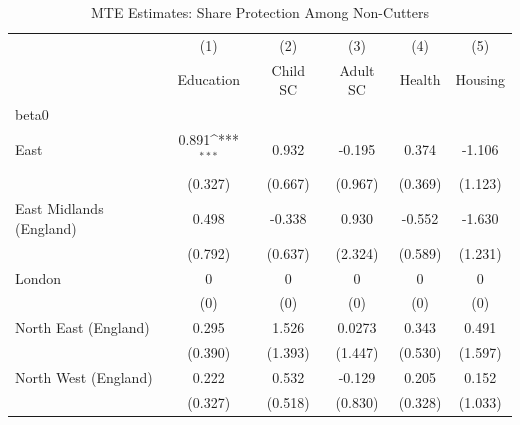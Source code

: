 \begin{table}[htbp]\centering
\def\sym#1{\ifmmode^{#1}\else\(^{#1}\)\fi}
\caption{MTE Estimates: Share Protection Among Non-Cutters}
\begin{tabular}{l*{5}{c}}
\toprule
                    &\multicolumn{1}{c}{(1)}&\multicolumn{1}{c}{(2)}&\multicolumn{1}{c}{(3)}&\multicolumn{1}{c}{(4)}&\multicolumn{1}{c}{(5)}\\
                    &\multicolumn{1}{c}{Education}&\multicolumn{1}{c}{Child SC}&\multicolumn{1}{c}{Adult SC}&\multicolumn{1}{c}{Health}&\multicolumn{1}{c}{Housing}\\
\midrule
beta0               &                     &                     &                     &                     &                     \\
East                &       0.891\sym{***}&       0.932         &      -0.195         &       0.374         &      -1.106         \\
                    &     (0.327)         &     (0.667)         &     (0.967)         &     (0.369)         &     (1.123)         \\
\addlinespace
East Midlands (England)&       0.498         &      -0.338         &       0.930         &      -0.552         &      -1.630         \\
                    &     (0.792)         &     (0.637)         &     (2.324)         &     (0.589)         &     (1.231)         \\
\addlinespace
London              &           0         &           0         &           0         &           0         &           0         \\
                    &         (0)         &         (0)         &         (0)         &         (0)         &         (0)         \\
\addlinespace
North East (England)&       0.295         &       1.526         &      0.0273         &       0.343         &       0.491         \\
                    &     (0.390)         &     (1.393)         &     (1.447)         &     (0.530)         &     (1.597)         \\
\addlinespace
North West (England)&       0.222         &       0.532         &      -0.129         &       0.205         &       0.152         \\
                    &     (0.327)         &     (0.518)         &     (0.830)         &     (0.328)         &     (1.033)         \\

\end{tabular}
\end{table}
